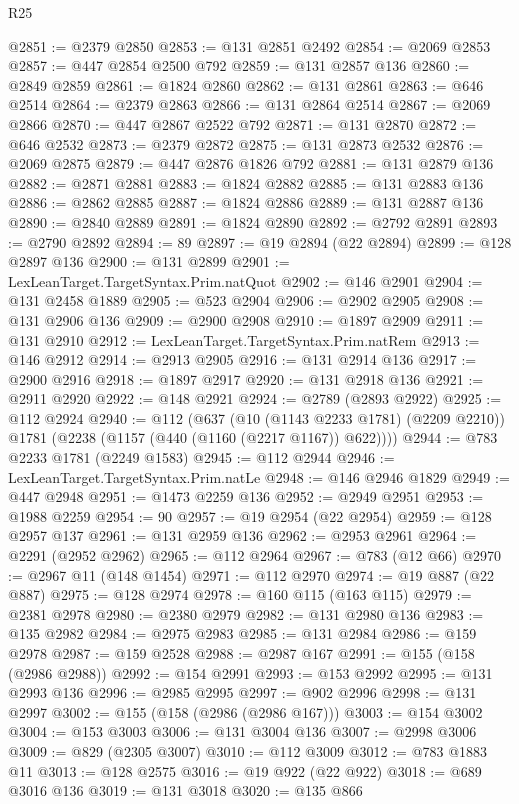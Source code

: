 \begin{lexlean}{R25}
\begin{coremodule}
@2851 := @2379 @2850
@2853 := @131 @2851 @2492
@2854 := @2069 @2853
@2857 := @447 @2854 @2500 @792
@2859 := @131 @2857 @136
@2860 := @2849 @2859
@2861 := @1824 @2860
@2862 := @131 @2861
@2863 := @646 @2514
@2864 := @2379 @2863
@2866 := @131 @2864 @2514
@2867 := @2069 @2866
@2870 := @447 @2867 @2522 @792
@2871 := @131 @2870
@2872 := @646 @2532
@2873 := @2379 @2872
@2875 := @131 @2873 @2532
@2876 := @2069 @2875
@2879 := @447 @2876 @1826 @792
@2881 := @131 @2879 @136
@2882 := @2871 @2881
@2883 := @1824 @2882
@2885 := @131 @2883 @136
@2886 := @2862 @2885
@2887 := @1824 @2886
@2889 := @131 @2887 @136
@2890 := @2840 @2889
@2891 := @1824 @2890
@2892 := @2792 @2891
@2893 := @2790 @2892
@2894 := 89
@2897 := @19 @2894 (@22 @2894)
@2899 := @128 @2897 @136
@2900 := @131 @2899
@2901 := LexLeanTarget.TargetSyntax.Prim.natQuot
@2902 := @146 @2901
@2904 := @131 @2458 @1889
@2905 := @523 @2904
@2906 := @2902 @2905
@2908 := @131 @2906 @136
@2909 := @2900 @2908
@2910 := @1897 @2909
@2911 := @131 @2910
@2912 := LexLeanTarget.TargetSyntax.Prim.natRem
@2913 := @146 @2912
@2914 := @2913 @2905
@2916 := @131 @2914 @136
@2917 := @2900 @2916
@2918 := @1897 @2917
@2920 := @131 @2918 @136
@2921 := @2911 @2920
@2922 := @148 @2921
@2924 := @2789 (@2893 @2922)
@2925 := @112 @2924
@2940 := @112
    (@637
      (@10 (@1143 @2233 @1781) (@2209 @2210))
      @1781
      (@2238 (@1157 (@440 (@1160 (@2217 @1167)) @622))))
@2944 := @783 @2233 @1781 (@2249 @1583)
@2945 := @112 @2944
@2946 := LexLeanTarget.TargetSyntax.Prim.natLe
@2948 := @146 @2946 @1829
@2949 := @447 @2948
@2951 := @1473 @2259 @136
@2952 := @2949 @2951
@2953 := @1988 @2259
@2954 := 90
@2957 := @19 @2954 (@22 @2954)
@2959 := @128 @2957 @137
@2961 := @131 @2959 @136
@2962 := @2953 @2961
@2964 := @2291 (@2952 @2962)
@2965 := @112 @2964
@2967 := @783 (@12 @66)
@2970 := @2967 @11 (@148 @1454)
@2971 := @112 @2970
@2974 := @19 @887 (@22 @887)
@2975 := @128 @2974
@2978 := @160 @115 (@163 @115)
@2979 := @2381 @2978
@2980 := @2380 @2979
@2982 := @131 @2980 @136
@2983 := @135 @2982
@2984 := @2975 @2983
@2985 := @131 @2984
@2986 := @159 @2978
@2987 := @159 @2528
@2988 := @2987 @167
@2991 := @155 (@158 (@2986 @2988))
@2992 := @154 @2991
@2993 := @153 @2992
@2995 := @131 @2993 @136
@2996 := @2985 @2995
@2997 := @902 @2996
@2998 := @131 @2997
@3002 := @155 (@158 (@2986 (@2986 @167)))
@3003 := @154 @3002
@3004 := @153 @3003
@3006 := @131 @3004 @136
@3007 := @2998 @3006
@3009 := @829 (@2305 @3007)
@3010 := @112 @3009
@3012 := @783 @1883 @11
@3013 := @128 @2575
@3016 := @19 @922 (@22 @922)
@3018 := @689 @3016 @136
@3019 := @131 @3018
@3020 := @135 @866

\end{coremodule}
\end{lexlean}
